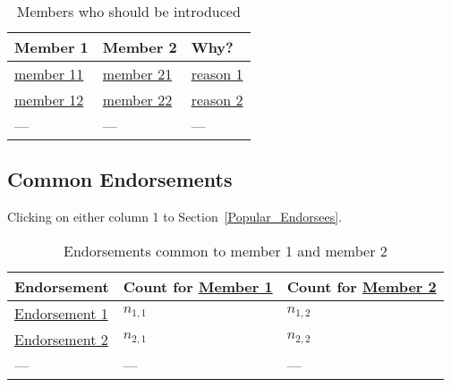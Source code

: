 \begin{table}[hb]
\centering
\begin{tabular}{|l|l|l|} \hline \hline
{\bf Member 1} & {\bf Member 2} & {\bf Why? } \\ \hline
\hline
\url{member 11} & \url{member 21} & \url{reason 1} \\ \hline
\url{member 12} & \url{member 22} & \url{reason 2} \\ \hline
--- & --- & --- \\ \hline
\hline
\end{tabular}
\caption{Members who should be introduced}
\label{tbl_suggested_introductions}
\end{table}


\subsection{Common Endorsements}
\label{Common_Endorsements}

Clicking on either column 1 to Section~\ref{Popular_Endorsees}.

\begin{table}[hb]
\centering
\begin{tabular}{|l|l|l|} \hline \hline
{\bf Endorsement} & {\bf Count for \url{Member 1}} & {\bf Count for
  \url{Member 2}} \\ \hline \hline 
\url{Endorsement 1} & \(n_{1,1}\) & \(n_{1,2}\) \\ \hline 
\url{Endorsement 2} & \(n_{2,1}\) & \(n_{2,2}\) \\ \hline 
--- & --- & --- \\ \hline
\hline
\end{tabular}
\caption{Endorsements common to member 1 and member 2}
\label{tbl_common_endorsements}
\end{table}

